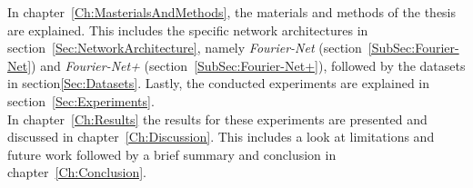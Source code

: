 In chapter~\ref{Ch:MasterialsAndMethods}, the materials and methods of the thesis are explained. This includes the specific network architectures in section~\ref{Sec:NetworkArchitecture}, namely \emph{Fourier-Net} (section~\ref{SubSec:Fourier-Net}) and \emph{Fourier-Net+} (section~\ref{SubSec:Fourier-Net+}), followed by the datasets in section\ref{Sec:Datasets}.
Lastly, the conducted experiments are explained in section~\ref{Sec:Experiments}.\\
In chapter~\ref{Ch:Results} the results for these experiments are presented and discussed in chapter~\ref{Ch:Discussion}. This includes a look at limitations and future work followed by a brief summary and conclusion in chapter~\ref{Ch:Conclusion}.
